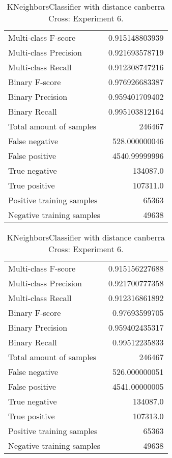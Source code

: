 \begin{table}[H]
\begin{minipage}{0.5\textwidth}
\caption{KNeighborsClassifier with distance canberra Cross: Experiment 5.}
\centering
\begin{tabular}{l r}
\toprule
Multi-class F-score & 0.915148803939 \\
Multi-class Precision & 0.921693578719 \\
Multi-class Recall & 0.912308747216 \\
\midrule
Binary F-score & 0.976926683387 \\
Binary Precision & 0.959401709402 \\
Binary Recall & 0.995103812164 \\
\midrule
Total amount of samples & 246467 \\
False negative & 528.000000046 \\
False positive & 4540.99999996 \\
True negative & 134087.0 \\
True positive & 107311.0 \\
\midrule
Positive training samples & 65363 \\
Negative training samples & 49638 \\
\bottomrule
\end{tabular}
\end{minipage}
\hfillx
\begin{minipage}{0.5\textwidth}
\caption{KNeighborsClassifier with distance canberra Cross: Experiment 6.}
\centering
\begin{tabular}{l r}
\toprule
Multi-class F-score & 0.915156227688 \\
Multi-class Precision & 0.921700777358 \\
Multi-class Recall & 0.912316861892 \\
\midrule
Binary F-score & 0.97693599705 \\
Binary Precision & 0.959402435317 \\
Binary Recall & 0.99512235833 \\
\midrule
Total amount of samples & 246467 \\
False negative & 526.000000051 \\
False positive & 4541.00000005 \\
True negative & 134087.0 \\
True positive & 107313.0 \\
\midrule
Positive training samples & 65363 \\
Negative training samples & 49638 \\
\bottomrule
\end{tabular}
\end{minipage}
\end{table}
